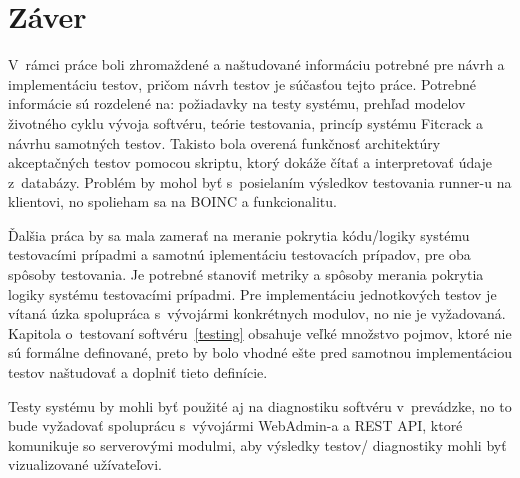 \chapter{Záver}
V~rámci práce boli zhromaždené a naštudované informáciu potrebné pre návrh a implementáciu testov, pričom návrh testov je súčasťou tejto práce.
Potrebné informácie sú rozdelené na: požiadavky na testy systému, prehľad modelov životného cyklu vývoja softvéru, teórie testovania, princíp systému Fitcrack a návrhu samotných testov.
Takisto bola overená funkčnosť architektúry akceptačných testov pomocou skriptu, ktorý dokáže čítať a interpretovať údaje z~databázy.
Problém by mohol byť s~posielaním výsledkov testovania runner-u na klientovi, no spolieham sa na BOINC a funkcionalitu.

Ďalšia práca by sa mala zamerať na meranie pokrytia kódu/logiky systému testovacími prípadmi a samotnú iplementáciu testovacích prípadov, pre oba spôsoby testovania.
Je potrebné stanoviť metriky a spôsoby merania pokrytia logiky systému testovacími prípadmi.
Pre implementáciu jednotkových testov je vítaná úzka spolupráca s~vývojármi konkrétnych modulov, no nie je vyžadovaná.
Kapitola o~testovaní softvéru~\ref{testing} obsahuje veľké množstvo pojmov, ktoré nie sú formálne definované, preto by bolo vhodné ešte pred samotnou implementáciou testov naštudovať a doplniť tieto definície.

Testy systému by mohli byť použité aj na diagnostiku softvéru v~prevádzke, no to bude vyžadovať spoluprácu s~vývojármi WebAdmin-a a REST API, ktoré komunikuje so serverovými modulmi, aby výsledky testov/ diagnostiky mohli byť vizualizované užívateľovi.
